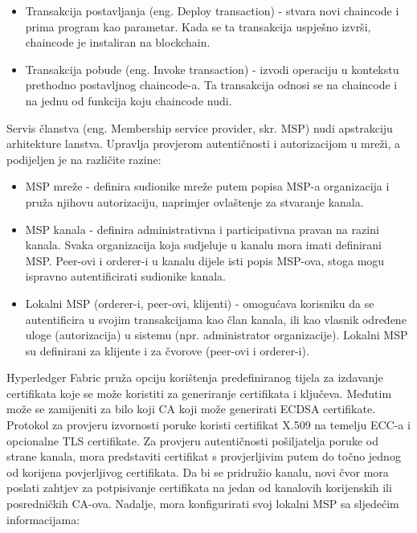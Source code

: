 \documentclass[times, utf8, diplomski]{fer}
\begin{document}
\begin{itemize}

\item Transakcija postavljanja (eng. Deploy transaction) - stvara novi chaincode i prima program kao parametar. Kada se ta transakcija uspješno izvrši, chaincode je instaliran na blockchain.

\item Transakcija pobude (eng. Invoke transaction) - izvodi operaciju u kontekstu prethodno postavljnog chaincode-a. Ta transakcija odnosi se na chaincode i na jednu od funkcija koju chaincode nudi.

\end{itemize}

Servis članstva (eng. Membership service provider, skr. MSP) nudi apstrakciju arhitekture lanstva. Upravlja provjerom autentičnosti i autorizacijom u mreži, a podijeljen je na različite razine:

\begin{itemize}

\item MSP mreže - definira sudionike mreže putem popisa MSP-a organizacija i pruža njihovu autorizaciju, naprimjer ovlaštenje za stvaranje kanala.

\item MSP kanala - definira administrativna i participativna pravan na razini kanala. Svaka organizacija koja sudjeluje u kanalu mora imati definirani MSP. Peer-ovi i orderer-i u kanalu dijele isti popis MSP-ova, stoga mogu ispravno autentificirati sudionike kanala.

\item Lokalni MSP (orderer-i, peer-ovi, klijenti) - omogućava korisniku da se autentificira u svojim transakcijama kao član kanala, ili kao vlasnik određene uloge (autorizacija) u sistemu (npr. administrator organizacije). Lokalni MSP su definirani za klijente i za čvorove (peer-ovi i orderer-i).

\end{itemize}

Hyperledger Fabric pruža opciju korištenja predefiniranog tijela za izdavanje certifikata koje se može koristiti za generiranje certifikata i ključeva. Međutim može se zamijeniti za bilo koji CA koji može generirati ECDSA certifikate. Protokol za provjeru izvornosti poruke koristi certifikat X.509 na temelju ECC-a \cite{lagarde2019security} i opcionalne TLS certifikate. Za provjeru autentičnosti pošiljatelja poruke od strane kanala, mora predstaviti certifikat s provjerljivim putem do točno jednog od korijena povjerljivog certifikata.  Da bi se pridružio kanalu, novi čvor mora poslati zahtjev za potpisivanje certifikata na jedan od kanalovih korijenskih ili posredničkih CA-ova. Nadalje, mora konfigurirati svoj lokalni MSP sa sljedećim informacijama:
\end{document}
